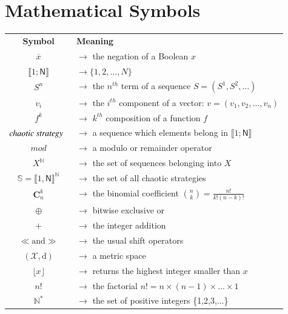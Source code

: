 \section{Mathematical Symbols}
\begin{tabular}{@{}c@{}@{}l@{}}
\textbf{Symbol} &\textbf{Meaning}\\
$\overline{x}$ & $\rightarrow$ the negation of a Boolean $x$\\
$\llbracket 1;\mathsf{N} \rrbracket$ & $\rightarrow\{1,2,\hdots,N\}$ \\
$S^{n}$ & $\rightarrow$ the $n^{th}$ term of a sequence $S=(S^{1},S^{2},\hdots)$ \\
$v_{i}$ & $\rightarrow$ the $i^{th}$ component of a vector: $v=(v_{1},v_{2},\hdots, v_n)$\\
$f^{k}$ & $\rightarrow$ $k^{th}$ composition of a function $f$ \\
$\emph{chaotic strategy}$~ & $\rightarrow$ a sequence which elements belong in $%
\llbracket 1;\mathsf{N} \rrbracket $ \\
$mod$ & $\rightarrow$ a modulo or remainder operator\\
$X^\mathds{N}$ & $\rightarrow$ the set of sequences belonging into $X$\\
$\mathbb{S} = \llbracket 1, \mathsf{N} \rrbracket^\mathds{N}$ & $\rightarrow$ the set of all chaotic strategies \\
$\mathbf{C}_n^k$ & $\rightarrow$ the binomial coefficient ${n \choose k} = \frac{n!}{k!(n-k)!}$\\
$\oplus$ & $\rightarrow$ bitwise exclusive or \\
$+$ & $\rightarrow$ the integer addition \\
$\ll \text{and} \gg$ & $\rightarrow$ the usual shift operators \\
$(\mathcal{X}, \text{d})$ & $\rightarrow$ a metric space  \\
$\lfloor x \rfloor$ & $\rightarrow$ returns the highest integer smaller than $x$  \\
$n!$ & $\rightarrow$ the factorial $n!=n\times(n-1)\times\dots\times1$\\
$\mathds{N}^{\ast }$ & $\rightarrow$ the set of positive integers \{1,2,3,...\}
\end{tabular}





